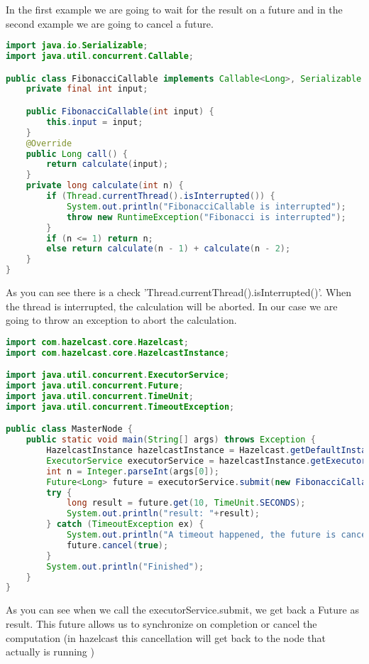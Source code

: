 In the first example we are going to wait for the result on a future and in the second example we are going to cancel a future.

\begin{lstlisting}[language=java]
import java.io.Serializable;
import java.util.concurrent.Callable;

public class FibonacciCallable implements Callable<Long>, Serializable {
    private final int input;

    public FibonacciCallable(int input) {
        this.input = input;
    }
    @Override
    public Long call() {
        return calculate(input);
    }
    private long calculate(int n) {
        if (Thread.currentThread().isInterrupted()) {
            System.out.println("FibonacciCallable is interrupted");
            throw new RuntimeException("Fibonacci is interrupted");
        }
        if (n <= 1) return n;
        else return calculate(n - 1) + calculate(n - 2);
    }
}
\end{lstlisting}

As you can see there is a check 'Thread.currentThread().isInterrupted()'. When the thread is interrupted, the calculation will be aborted. In our case we are going to throw an exception to abort the calculation.

\begin{lstlisting}[language=java]
import com.hazelcast.core.Hazelcast;
import com.hazelcast.core.HazelcastInstance;

import java.util.concurrent.ExecutorService;
import java.util.concurrent.Future;
import java.util.concurrent.TimeUnit;
import java.util.concurrent.TimeoutException;

public class MasterNode {
    public static void main(String[] args) throws Exception {
        HazelcastInstance hazelcastInstance = Hazelcast.getDefaultInstance();
        ExecutorService executorService = hazelcastInstance.getExecutorService();
        int n = Integer.parseInt(args[0]);
        Future<Long> future = executorService.submit(new FibonacciCallable(n));
        try {
            long result = future.get(10, TimeUnit.SECONDS);
            System.out.println("result: "+result);
        } catch (TimeoutException ex) {
            System.out.println("A timeout happened, the future is cancelled");
            future.cancel(true);
        }
        System.out.println("Finished");
    }
}
\end{lstlisting}
As you can see when we call the executorService.submit, we get back a Future as result. This future allows us to synchronize on completion or cancel the computation (in hazelcast this cancellation will get back to the node that actually is running )

